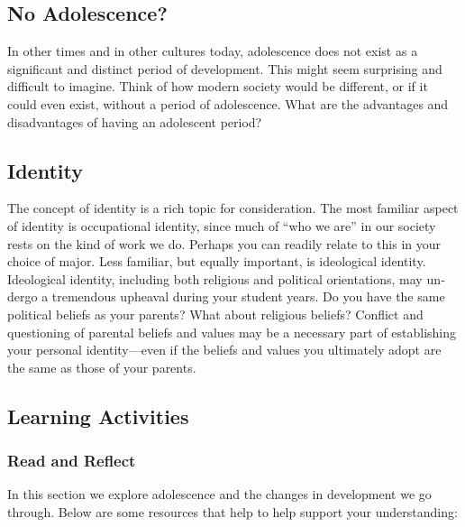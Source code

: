 \documentclass[
]{book}
\begin{document}
\hypertarget{no-adolescence}{%
\subsection*{No Adolescence?}\label{no-adolescence}}

In other times and in other cultures to­day, adolescence does not exist as a significant and distinct period of develop­ment. This might seem surprising and difficult to imagine. Think of how modern society would be different, or if it could even exist, without a period of adolescence. What are the advantages and disadvantages of having an adolescent period?

\hypertarget{identity}{%
\subsection*{Identity}\label{identity}}

The concept of identity is a rich topic for consideration. The most familiar aspect of identity is occupational identity, since much of ``who we are'' in our society rests on the kind of work we do. Perhaps you can readily relate to this in your choice of major. Less familiar, but equally important, is ideological identity. Ideologi­cal identity, including both religious and political orientations, may un­dergo a tremen­dous upheaval during your student years. Do you have the same political beliefs as your parents? What about religious beliefs? Conflict and questioning of parental beliefs and values may be a necessary part of establishing your personal iden­tity---even if the beliefs and values you ultimately adopt are the same as those of your parents.

\hypertarget{learning-activities-4}{%
\subsection*{Learning Activities}\label{learning-activities-4}}

\hypertarget{read-and-reflect}{%
\subsubsection*{Read and Reflect}\label{read-and-reflect}}

In this section we explore adolescence and the changes in development we go through. Below are some resources that help to help support your understanding:
\end{document}
